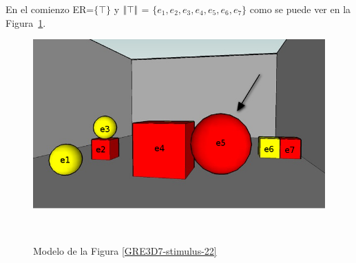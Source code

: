



En el comienzo ER=$\{\top\}$ y $|\!|\top|\!|$ = $\{e_1, e_2, e_3, e_4, e_5, e_6, e_7\}$ como se puede ver en la Figura~\ref{fig-modelo}.\\


\begin{figure}[ht]
\begin{minipage}[b]{0.45\linewidth}
\centering
\includegraphics[width=\textwidth]{images/22.jpg}
\vspace*{1cm}
\label{GRE3D7-stimulus-22}
\end{minipage}
\begin{minipage}[b]{0.6\linewidth}
\centering
\\[0pt]
\caption{Modelo de la Figura \ref{GRE3D7-stimulus-22}}
\label{fig-modelo}
\end{minipage}
\end{figure}

